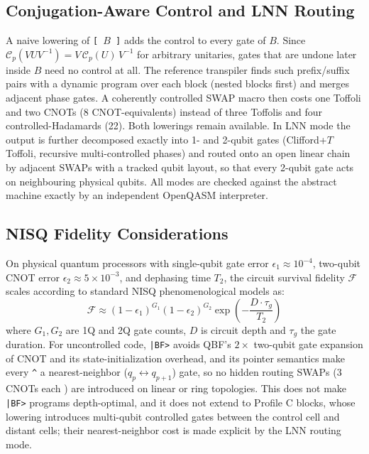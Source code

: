 \documentclass[11pt,a4paper,twocolumn]{article}
\begin{document}
\subsection{Conjugation-Aware Control and LNN Routing}
\label{sec:conj_ctrl}
A naive lowering of \texttt{[ $B$ ]} adds the control to every gate of $B$. Since $\mathcal{C}_p(V U V^{-1}) = V\,\mathcal{C}_p(U)\,V^{-1}$ for arbitrary unitaries, gates that are undone later inside $B$ need no control at all. The reference transpiler finds such prefix/suffix pairs with a dynamic program over each block (nested blocks first) and merges adjacent phase gates. A coherently controlled SWAP macro then costs one Toffoli and two CNOTs (8 CNOT-equivalents) instead of three Toffolis and four controlled-Hadamards (22). Both lowerings remain available. In LNN mode the output is further decomposed exactly into 1- and 2-qubit gates (Clifford+$T$ Toffoli, recursive multi-controlled phases) and routed onto an open linear chain by adjacent SWAPs with a tracked qubit layout, so that every 2-qubit gate acts on neighbouring physical qubits. All modes are checked against the abstract machine exactly by an independent OpenQASM interpreter.

\subsection{NISQ Fidelity Considerations}
On physical quantum processors with single-qubit gate error $\epsilon_1 \approx 10^{-4}$, two-qubit CNOT error $\epsilon_2 \approx 5 \times 10^{-3}$, and dephasing time $T_2$, the circuit survival fidelity $\mathcal{F}$ scales according to standard NISQ phenomenological models \cite{preskill2018nisq,arute2019supremacy} as:
\begin{equation}
    \mathcal{F} \approx (1 - \epsilon_1)^{G_1} (1 - \epsilon_2)^{G_2} \exp\!\left(-\frac{D \cdot \tau_g}{T_2}\right)
\end{equation}
where $G_1, G_2$ are 1Q and 2Q gate counts, $D$ is circuit depth and $\tau_g$ the gate duration. For uncontrolled code, \texttt{|BF>} avoids QBF's $2\times$ two-qubit gate expansion of CNOT and its state-initialization overhead, and its pointer semantics make every \texttt{\^{}} a nearest-neighbor ($q_p \leftrightarrow q_{p+1}$) gate, so no hidden routing SWAPs (3 CNOTs each \cite{fowler2004lnn,saeedi2011lnn}) are introduced on linear or ring topologies. This does not make \texttt{|BF>} programs depth-optimal, and it does not extend to Profile C blocks, whose lowering introduces multi-qubit controlled gates between the control cell and distant cells; their nearest-neighbor cost is made explicit by the LNN routing mode.
\end{document}
